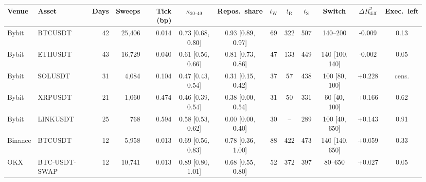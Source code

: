 \begin{tabular}{llrrrcccccccc}
\toprule
Venue & Asset & Days & Sweeps & Tick (bp) & $\kappa_{20\text{--}40}$ & Repos.\ share & $\bar t_{\mathrm{W}}$ & $\bar t_{\mathrm{R}}$ & $\bar t_{\mathrm{S}}$ & Switch & $\Delta R^2_{\mathrm{diff}}$ & Exec.\ left \\
\midrule
Bybit & BTCUSDT & 42 & 25{,}406 & 0.014 & 0.73 {\scriptsize[0.68, 0.80]} & 0.93 {\scriptsize[0.89, 0.97]} & 69 & 322 & 507 & 140--200 & -0.009 & 0.13 \\
Bybit & ETHUSDT & 43 & 16{,}729 & 0.040 & 0.61 {\scriptsize[0.56, 0.66]} & 0.81 {\scriptsize[0.73, 0.86]} & 47 & 133 & 449 & 140 {\scriptsize[100, 140]} & -0.002 & 0.05 \\
Bybit & SOLUSDT & 31 & 4{,}084 & 0.104 & 0.47 {\scriptsize[0.43, 0.54]} & 0.31 {\scriptsize[0.15, 0.42]} & 37 & 57 & 438 & 100 {\scriptsize[80, 100]} & +0.228 & cens. \\
Bybit & XRPUSDT & 21 & 1{,}060 & 0.474 & 0.46 {\scriptsize[0.39, 0.54]} & 0.38 {\scriptsize[0.00, 0.54]} & 31 & 50 & 331 & 60 {\scriptsize[40, 100]} & +0.166 & 0.62 \\
Bybit & LINKUSDT & 25 & 768 & 0.594 & 0.58 {\scriptsize[0.53, 0.62]} & 0.00 {\scriptsize[0.00, 0.40]} & 30 & -- & 289 & 100 {\scriptsize[40, 650]} & +0.143 & 0.91 \\
Binance & BTCUSDT & 12 & 5{,}958 & 0.013 & 0.69 {\scriptsize[0.56, 0.83]} & 0.78 {\scriptsize[0.36, 1.00]} & 88 & 422 & 473 & 140 {\scriptsize[140, 650]} & +0.059 & 0.33 \\
OKX & BTC-USDT-SWAP & 12 & 10{,}741 & 0.013 & 0.89 {\scriptsize[0.80, 1.01]} & 0.68 {\scriptsize[0.55, 0.80]} & 52 & 372 & 397 & 80--650 & +0.027 & 0.05 \\
\bottomrule
\end{tabular}
